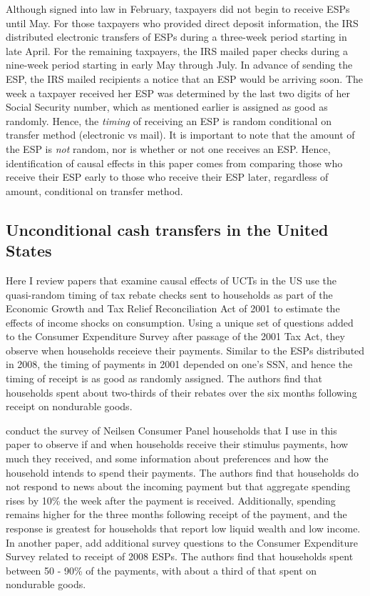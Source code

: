 \documentclass[12pt]{article}
\begin{document}
Although signed into law in February, taxpayers did not begin to receive ESPs until May. For those taxpayers who provided direct deposit information, the IRS distributed electronic transfers of ESPs during a three-week period starting in late April. For the remaining taxpayers, the IRS mailed paper checks during a nine-week period starting in early May through July. In advance of sending the ESP, the IRS mailed recipients a notice that an ESP would be arriving soon. The week a taxpayer received her ESP was determined by the last two digits of her Social Security number, which as mentioned earlier is assigned as good as randomly. Hence, the \textit{timing} of receiving an ESP is random conditional on transfer method (electronic vs mail). It is important to note that the amount of the ESP is \textit{not} random, nor is whether or not one receives an ESP. Hence, identification of causal effects in this paper comes from comparing those who receive their ESP early to those who receive their ESP later, regardless of amount, conditional on transfer method.

\subsection{Unconditional cash transfers in the United States}

Here I review papers that examine causal effects of UCTs in the US \textcite{johnson2006household} use the quasi-random timing of tax rebate checks sent to households as part of the Economic Growth and Tax Relief Reconciliation Act of 2001 to estimate the effects of income shocks on consumption. Using a unique set of questions added to the Consumer Expenditure Survey after passage of the 2001 Tax Act, they observe when households receieve their payments. Similar to the ESPs distributed in 2008, the timing of payments in 2001 depended on one's SSN, and hence the timing of receipt is as good as randomly assigned. The authors find that households spent about two-thirds of their rebates over the six months following receipt on nondurable goods.

\textcite{broda2014economic} conduct the survey of Neilsen Consumer Panel households that I use in this paper to observe if and when households receive their stimulus payments, how much they received, and some information about preferences and how the household intends to spend their payments. The authors find that households do not respond to news about the incoming payment but that aggregate spending rises by 10\% the week after the payment is received. Additionally, spending remains higher for the three months following receipt of the payment, and the response is greatest for households that report low liquid wealth and low income. In another paper, \textcite{parker2013consumer} add additional survey questions to the Consumer Expenditure Survey related to receipt of 2008 ESPs. The authors find that households spent between 50 - 90\% of the payments, with about a third of that spent on nondurable goods.
\end{document}
